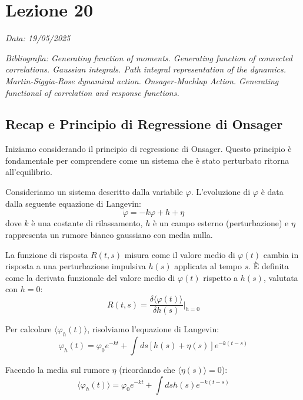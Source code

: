\chapter{Lezione 20}
\label{chap:lezione_20} %

\begin{flushright}
\textit{Data: 19/05/2025}
\end{flushright}
\textit{Bibliografia: 
Generating function of moments. Generating function of connected correlations. Gaussian integrals. Path integral representation of the dynamics. Martin-Siggia-Rose dynamical action. Onsager-Machlup Action. Generating functional of correlation and response functions.}

\section{Recap e Principio di Regressione di Onsager}
Iniziamo considerando il principio di regressione di Onsager. Questo principio è fondamentale per comprendere come un sistema che è stato perturbato ritorna all'equilibrio.

Consideriamo un sistema descritto dalla variabile $\varphi$. L'evoluzione di $\varphi$ è data dalla seguente equazione di Langevin:
\begin{equation}
\dot{\varphi} = -k\varphi + h + \eta
\label{eq:langevin_recap}
\end{equation}
dove $k$ è una costante di rilassamento, $h$ è un campo esterno (perturbazione) e $\eta$ rappresenta un rumore bianco gaussiano con media nulla.

La funzione di risposta $R(t,s)$ misura come il valore medio di $\varphi(t)$ cambia in risposta a una perturbazione impulsiva $h(s)$ applicata al tempo $s$. È definita come la derivata funzionale del valore medio di $\varphi(t)$ rispetto a $h(s)$, valutata con $h=0$:
\begin{equation}
R(t,s) = \frac{\delta \langle \varphi(t) \rangle}{\delta h(s)} \bigg|_{h=0}
\end{equation}

Per calcolare $\langle \varphi_h(t) \rangle$, risolviamo l'equazione di Langevin:
\begin{equation}
\varphi_h(t) = \varphi_0 e^{-kt} + \int ds [h(s) + \eta(s)] e^{-k(t-s)}
\end{equation}

Facendo la media sul rumore $\eta$ (ricordando che $\langle \eta(s) \rangle = 0$):
\begin{equation}
\langle \varphi_h(t) \rangle = \varphi_0 e^{-kt} + \int ds h(s) e^{-k(t-s)}
\end{equation}

